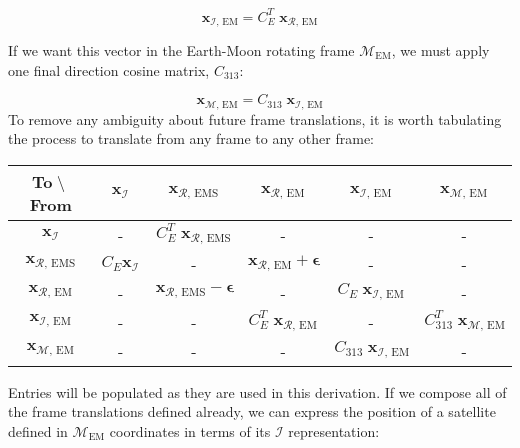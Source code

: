 \documentclass[]{article}
\begin{document}
	\begin{equation}
		\mathbf{x}_{\mathcal{I}\text{, EM}} = C_E^T \; \mathbf{x}_{\mathcal{R}\text{, EM}}
	\end{equation}
	
	If we want this vector in the Earth-Moon rotating frame $\mathcal{M}_\text{EM}$, we must apply one final direction cosine matrix, $C_\text{313}$:
	
	\begin{equation}
		\mathbf{x}_{\mathcal{M}\text{, EM}} = C_\text{313} \; \mathbf{x}_{\mathcal{I}\text{, EM}}
	\end{equation}
	To remove any ambiguity about future frame translations, it is worth tabulating the process to translate from any frame to any other frame:
	
	\begin{table}[ht!]
		\centering
		\begin{tabular}{|c|c|c|c|c|c|} \hline
			To$\;\setminus\;$From & $\mathbf{x}_\mathcal{I}$ & $\mathbf{x}_{\mathcal{R}\text{, EMS}}$ & $\mathbf{x}_{\mathcal{R}\text{, EM}}$ & $\mathbf{x}_{\mathcal{I}\text{, EM}}$ & $\mathbf{x}_{\mathcal{M}\text{, EM}}$ \\ \hline \hline
			$\mathbf{x}_\mathcal{I}$ & - & $C_E^T\;\mathbf{x}_{\mathcal{R}\text{, EMS}}$ & - & - & - \\ \hline
			$\mathbf{x}_{\mathcal{R}\text{, EMS}}$ & $C_E\mathbf{x}_\mathcal{I}$ & - & $\mathbf{x}_{\mathcal{R}\text{, EM}} + \boldsymbol{\epsilon}$ & - & - \\ \hline
			$\mathbf{x}_{\mathcal{R}\text{, EM}}$ & - & $\mathbf{x}_{\mathcal{R}\text{, EMS}} - \boldsymbol{\epsilon}$ & - & $C_E \; \mathbf{x}_{\mathcal{I}\text{, EM}}$ & - \\ \hline
		 	$\mathbf{x}_{\mathcal{I}\text{, EM}}$ & - & - & $C_E^T \; \mathbf{x}_{\mathcal{R}\text{, EM}}$ & - & $C_\text{313}^T \; \mathbf{x}_{\mathcal{M}\text{, EM}}$ \\ \hline
			$\mathbf{x}_{\mathcal{M}\text{, EM}}$ & - & - & - & $C_\text{313} \; \mathbf{x}_{\mathcal{I}\text{, EM}}$ & - \\ \hline
		\end{tabular}
	\end{table}
	
	Entries will be populated as they are used in this derivation.  If we compose all of the frame translations defined already, we can express the position of a satellite defined in $\mathcal{M}_\text{EM}$ coordinates in terms of its $\mathcal{I}$ representation:
	
\end{document}
